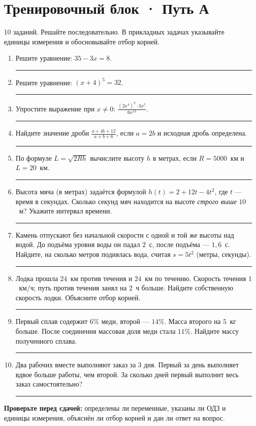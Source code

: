 \documentclass[a4paper,12pt]{article}
\newcommand{\fine}[1]{{\small\color{muted}#1}}
\newcommand{\answerline}{\par\vspace{8mm}\noindent\color{lightline}\rule{0.78\linewidth}{0.35pt}\color{textgray}\par}
\begin{document}
\clearpage
\section*{Тренировочный блок · Путь А}
\fine{10 заданий. Решайте последовательно. В прикладных задачах указывайте единицы измерения и обосновывайте отбор корней.}
\begin{enumerate}[label=\textbf{\arabic*.},leftmargin=*,itemsep=5mm,topsep=6mm]
\item Решите уравнение: $35-3x=8$.
\answerline
\item Решите уравнение: $(x+4)^5=32$.
\answerline
\item Упростите выражение при $x\ne0$:
  $\displaystyle \frac{(2x^4)^2\cdot3x^5}{6x^{13}}$.
\answerline
\item Найдите значение дроби $\displaystyle\frac{a+4b+12}{a+b+6}$,
  если $a=2b$ и исходная дробь определена.
\answerline
\item По формуле $L=\sqrt{2Rh}$ вычислите высоту $h$ в метрах,
  если $R=5000$~км и $L=20$~км.
\answerline
\newpage
\item Высота мяча (в метрах) задаётся формулой $h(t)=2+12t-4t^2$,
  где $t$ --- время в секундах. Сколько секунд мяч находится на высоте
  \emph{строго выше} $10$~м? Укажите интервал времени.
\answerline
\item Камень отпускают без начальной скорости с одной и той же высоты
  над водой. До подъёма уровня воды он падал $2$~с, после подъёма ---
  $1{,}6$~с. Найдите, на сколько метров поднялась вода, считая
  $s=5t^2$ (метры, секунды).
\answerline
\item Лодка прошла $24$~км против течения и $24$~км по течению.
  Скорость течения $1$~км/ч; путь против течения занял на $2$~ч больше.
  Найдите собственную скорость лодки. Объясните отбор корней.
\answerline
\item Первый сплав содержит $6\%$ меди, второй --- $14\%$.
  Масса второго на $5$~кг больше. После соединения массовая доля
  меди стала $11\%$. Найдите массу полученного сплава.
\answerline
\item Два рабочих вместе выполняют заказ за $3$ дня. Первый за день
  выполняет вдвое больше работы, чем второй. За сколько дней
  первый выполнит весь заказ самостоятельно?
\answerline
\end{enumerate}
\vspace{5mm}
\textbf{Проверьте перед сдачей:} определены ли переменные, указаны ли ОДЗ\newline
и единицы измерения, объяснён ли отбор корней и дан ли ответ на вопрос.
\clearpage
\end{document}
